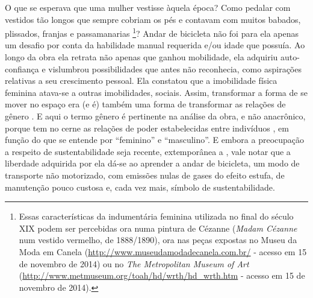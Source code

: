 O que se esperava que uma mulher vestisse àquela época? Como pedalar com vestidos tão longos que sempre cobriam os pés e contavam com muitos babados, plissados, franjas e passamanarias
\footnote{Essas características da indumentária feminina utilizada no final do século XIX podem ser percebidas ora numa pintura de Cézanne (\emph{Madam Cézanne} num vestido vermelho, de 1888/1890), ora nas peças expostas no Museu da Moda em Canela (\url{http://www.museudamodadecanela.com.br/} - acesso em 15 de novembro de 2014) ou no \emph{The Metropolitan Museum of Art} (\url{http://www.metmuseum.org/toah/hd/wrth/hd_wrth.htm} - acesso em 15 de novembro de 2014).}?
Andar de bicicleta não foi para ela apenas um desafio por conta da habilidade manual requerida e/ou idade que possuía. Ao longo da obra ela retrata não apenas que ganhou mobilidade, ela adquiriu auto-confiança e vislumbrou possibilidades que antes não reconhecia, como aspirações relativas a seu crescimento pessoal. Ela constatou que a imobilidade física feminina atava-se a outras imobilidades, sociais. Assim, transformar a forma de se mover no espaço era (e é) também uma forma de transformar as relações de gênero \cite{HANSON2010}. E aqui o termo gênero é pertinente na análise da obra, e não anacrônico, porque tem no cerne as relações de poder estabelecidas entre indivíduos
\cite{SCOTT1986}, em função do que se entende por ``feminino'' e ``masculino''.
E embora a preocupação a respeito de sustentabilidade seja recente, extemporânea a , vale notar que a liberdade adquirida por ela dá-se ao aprender a andar de bicicleta, um modo de transporte não motorizado, com emissões nulas de gases do efeito estufa, de manutenção pouco custosa e, cada vez mais, símbolo de sustentabilidade.

